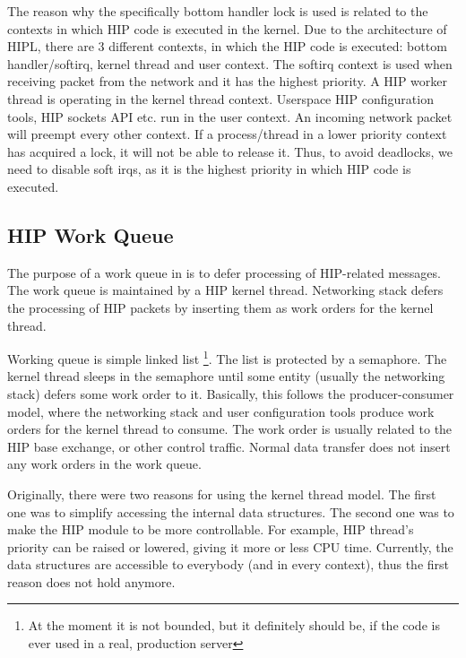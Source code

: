 The reason why the specifically bottom handler lock is used is related
to the contexts in which \ac{HIP} code is executed in the kernel.  Due
to the architecture of \ac{HIPL}, there are 3 different contexts, in
which the \ac{HIP} code is executed: bottom handler/softirq, kernel
thread and user context.  The softirq context is used when receiving
packet from the network and it has the highest priority. A \ac{HIP}
worker thread is operating in the kernel thread context.  Userspace
\ac{HIP} configuration tools, \ac{HIP} sockets API etc. run in the
user context.  An incoming network packet will preempt every other
context. If a process/thread in a lower priority context has acquired
a lock, it will not be able to release it. Thus, to avoid deadlocks,
we need to disable soft irqs, as it is the highest priority in which
\ac{HIP} code is executed.

\subsection{HIP Work Queue}
\label{sec:work_queue_architecture}

The purpose of a work queue in is to defer processing of HIP-related
messages. The work queue is maintained by a \ac{HIP} kernel
thread. Networking stack defers the processing of \ac{HIP} packets by
inserting them as work orders for the kernel thread.

Working queue is simple linked list \footnote{At the moment it is not
bounded, but it definitely should be, if the code is ever used in a
real, production server}. The list is protected by a semaphore. The
kernel thread sleeps in the semaphore until some entity (usually the
networking stack) defers some work order to it. Basically, this
follows the producer-consumer model, where the networking stack and
user configuration tools produce work orders for the kernel thread to
consume. The work order is usually related to the \ac{HIP} base
exchange, or other control traffic.  Normal data transfer does not insert
any work orders in the work queue.

Originally, there were two reasons for using the kernel thread
model. The first one was to simplify accessing the internal data
structures. The second one was to make the \ac{HIP} module to be more
controllable.  For example, \ac{HIP} thread's priority can be raised
or lowered, giving it more or less \ac{CPU} time.  Currently, the data
structures are accessible to everybody (and in every context), thus
the first reason does not hold anymore.

